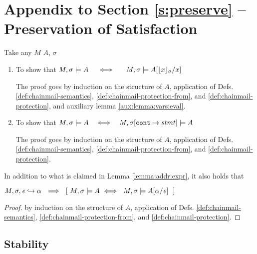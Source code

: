 \section{Appendix to Section \ref{s:preserve} -- Preservation of Satisfaction }
\label{app:preserve}

 

Take any $M$ $A$, $\sigma$

\begin{enumerate}
\item
To show that  $ \satisfiesA{M}{\sigma}{A}\ \ \ \ \Longleftrightarrow \ \ \ \ \ \satisfiesA{M}{\sigma}{A[{\interpret \sigma x}/x]} $ 

The proof goes by induction on the structure of $A$,   application of  Defs.  \ref{def:chainmail-semantics}, \ref{def:chainmail-protection-from}, and  \ref{def:chainmail-protection}, and auxiliary lemma \ref{aux:lemma:vars:eval}.



\item
To show that $ \satisfiesA{M}{\sigma}{A}   \ \ \ \Longleftrightarrow\ \ \ \satisfiesA{M}{\sigma[\prg{cont}\mapsto stmt]}{A}$ 

The proof goes by induction on the structure of $A$,   application of  Defs.  \ref{def:chainmail-semantics}, \ref{def:chainmail-protection-from}, and  \ref{def:chainmail-protection}.


\end{enumerate}

\completeProof

 
In addition to what is claimed in Lemma  \ref{lemma:addr:expr}, it  also holds that 
\begin{lemma}
$\eval{M}{\sigma}{{\re}}{\alpha}  \ \ \Longrightarrow\ \  [ \ \satisfiesA{M}{\sigma}{A} \  \Longleftrightarrow\   \  \satisfiesA{M}{\sigma}{A[\alpha/\re]} \  \  ]$
\end{lemma}

\begin{proof} by induction on the structure of $A$,   application of  Defs.  \ref{def:chainmail-semantics}, \ref{def:chainmail-protection-from}, and  \ref{def:chainmail-protection}.
\end{proof}

\subsection{Stability}

